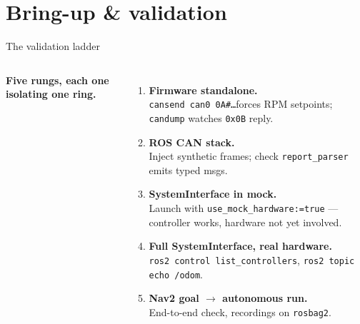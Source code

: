 
\section{Bring-up \& validation}

\begin{frame}{The validation ladder}
  \begin{columns}[T,onlytextwidth]
      \textbf{Five rungs, each one isolating one ring.}
      \begin{enumerate}\setlength\itemsep{2pt}
        \item \textbf{Firmware standalone.}\\
              \footnotesize\texttt{cansend can0 0A\#…}\;forces RPM
              setpoints; \texttt{candump} watches \texttt{0x0B} reply.
        \item \textbf{ROS CAN stack.}\\
              \footnotesize Inject synthetic frames; check
              \texttt{report\_parser} emits typed msgs.
        \item \textbf{SystemInterface in mock.}\\
              \footnotesize Launch with
              \texttt{use\_mock\_hardware:=true} — controller works,
              hardware not yet involved.
        \item \textbf{Full SystemInterface, real hardware.}\\
              \footnotesize \texttt{ros2 control list\_controllers},\;
              \texttt{ros2 topic echo /odom}.
        \item \textbf{Nav2 goal $\to$ autonomous run.}\\
              \footnotesize End-to-end check, recordings on \texttt{rosbag2}.
      \end{enumerate}

      \centering


\end{columns}
\end{frame}
